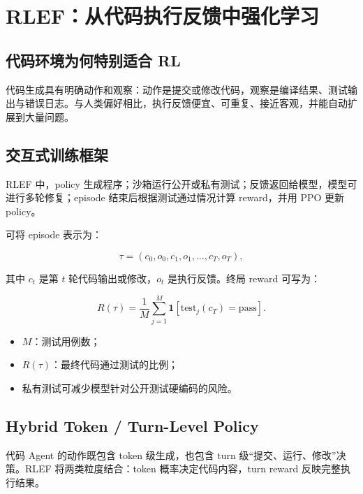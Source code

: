 \section{RLEF：从代码执行反馈中强化学习}

\subsection{代码环境为何特别适合 RL}

代码生成具有明确动作和观察：动作是提交或修改代码，观察是编译结果、测试输出与错误日志。与人类偏好相比，执行反馈便宜、可重复、接近客观，并能自动扩展到大量问题。


\subsection{交互式训练框架}

RLEF 中，policy 生成程序；沙箱运行公开或私有测试；反馈返回给模型，模型可进行多轮修复；episode 结束后根据测试通过情况计算 reward，并用 PPO 更新 policy。


可将 episode 表示为：

$$
\tau=(c_0,o_0,c_1,o_1,\ldots,c_T,o_T),
$$

其中 $c_t$ 是第 $t$ 轮代码输出或修改，$o_t$ 是执行反馈。终局 reward 可写为：

$$
R(\tau)=\frac{1}{M}\sum_{j=1}^{M}\mathbf 1[\mathrm{test}_j(c_T)=\mathrm{pass}].
$$

\begin{itemize}
    \item $M$：测试用例数；
    \item $R(\tau)$：最终代码通过测试的比例；
    \item 私有测试可减少模型针对公开测试硬编码的风险。
\end{itemize}

\subsection{Hybrid Token / Turn-Level Policy}

代码 Agent 的动作既包含 token 级生成，也包含 turn 级“提交、运行、修改”决策。RLEF 将两类粒度结合：token 概率决定代码内容，turn reward 反映完整执行结果。

